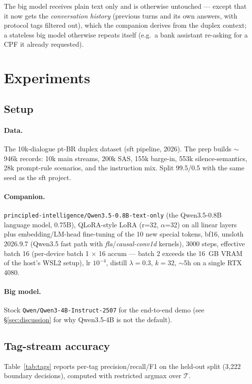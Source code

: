 \documentclass[conference]{IEEEtran}
\begin{document}
The big model receives plain text only and is otherwise untouched — except
that it now gets the \emph{conversation history} (previous turns and its own
answers, with protocol tags filtered out), which the companion derives from
the duplex context; a stateless big model otherwise repeats itself (e.g.\ a
bank assistant re-asking for a CPF it already requested).

\section{Experiments}

\subsection{Setup}
\paragraph{Data.} The 10k-dialogue pt-BR duplex dataset (sft pipeline, 2026).
The prep builds $\sim$946k records: 10k main streams, 200k SAS, 155k
barge-in, 553k silence-semantics, 28k prompt-rule scenarios, and the
instruction mix. Split 99.5/0.5 with the same seed as the sft project.

\paragraph{Companion.} \texttt{principled-intelligence/Qwen3.5-0.8B-text-only}
(the Qwen3.5-0.8B language model, 0.75B), QLoRA-style LoRA (r=32, $\alpha$=32)
on all linear layers plus embedding/LM-head fine-tuning of the 10 new special
tokens, bf16, unsloth 2026.9.7 (Qwen3.5 fast path with
\emph{fla}/\emph{causal-conv1d} kernels), 3000 steps, effective batch 16
(per-device batch 1 $\times$ 16 accum — batch 2 exceeds the 16~GB VRAM of the
host's WSL2 setup), lr $10^{-4}$, distill $\lambda=0.3$, $k=32$,
$\sim$5h on a single RTX 4080.

\paragraph{Big model.} Stock \texttt{Qwen/Qwen3-4B-Instruct-2507} for the
end-to-end demo (see \S\ref{sec:discussion} for why Qwen3.5-4B is not the
default).

\subsection{Tag-stream accuracy}
Table~\ref{tab:tags} reports per-tag precision/recall/F1 on the held-out
split (3,222 boundary decisions), computed with restricted argmax over
$\mathcal{T}$.
\end{document}
